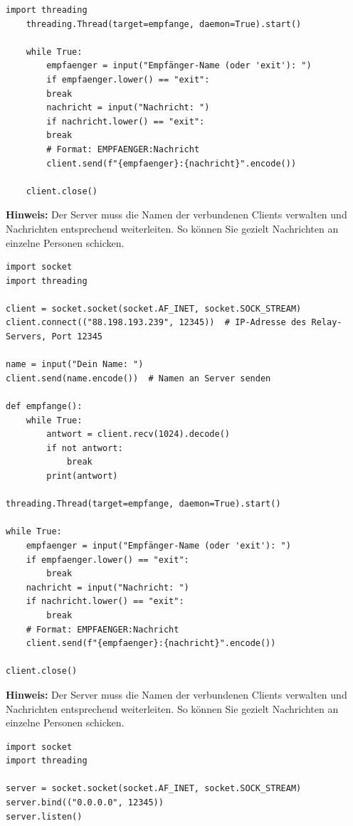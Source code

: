 \begin{myexercise}
\begin{lstlisting}[caption={client.py}]
    import threading
    threading.Thread(target=empfange, daemon=True).start()

    while True:
        empfaenger = input("Empfänger-Name (oder 'exit'): ")
        if empfaenger.lower() == "exit":
        break
        nachricht = input("Nachricht: ")
        if nachricht.lower() == "exit":
        break
        # Format: EMPFAENGER:Nachricht
        client.send(f"{empfaenger}:{nachricht}".encode())

    client.close()
        \end{lstlisting}
    \textbf{Hinweis:} Der Server muss die Namen der verbundenen Clients verwalten und Nachrichten entsprechend weiterleiten. So können Sie gezielt Nachrichten an einzelne Personen schicken.
    \begin{myanswer}
        \begin{lstlisting}[caption=\texttt{client.py}]
import socket
import threading

client = socket.socket(socket.AF_INET, socket.SOCK_STREAM)
client.connect(("88.198.193.239", 12345))  # IP-Adresse des Relay-Servers, Port 12345

name = input("Dein Name: ")
client.send(name.encode())  # Namen an Server senden

def empfange():
    while True:
        antwort = client.recv(1024).decode()
        if not antwort:
            break
        print(antwort)

threading.Thread(target=empfange, daemon=True).start()

while True:
    empfaenger = input("Empfänger-Name (oder 'exit'): ")
    if empfaenger.lower() == "exit":
        break
    nachricht = input("Nachricht: ")
    if nachricht.lower() == "exit":
        break
    # Format: EMPFAENGER:Nachricht
    client.send(f"{empfaenger}:{nachricht}".encode())

client.close()
        \end{lstlisting}
        \textbf{Hinweis:} Der Server muss die Namen der verbundenen Clients verwalten und Nachrichten entsprechend weiterleiten. So können Sie gezielt Nachrichten an einzelne Personen schicken.
    \end{myanswer}
    \begin{myanswer}
        \begin{lstlisting}[caption=\texttt{server.py}]
import socket
import threading

server = socket.socket(socket.AF_INET, socket.SOCK_STREAM)
server.bind(("0.0.0.0", 12345))
server.listen()


\end{lstlisting}
\end{myanswer}
\end{myexercise}
